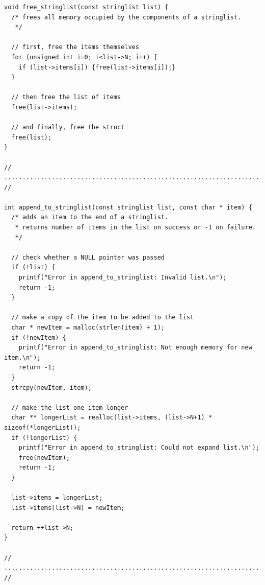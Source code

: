 \begin{codebox}[]
\begin{verbatim}
void free_stringlist(const stringlist list) {
  /* frees all memory occupied by the components of a stringlist.
   */
  
  // first, free the items themselves
  for (unsigned int i=0; i<list->N; i++) {
    if (list->items[i]) {free(list->items[i]);}
  }
  
  // then free the list of items
  free(list->items);
  
  // and finally, free the struct
  free(list);
}

// ......................................................................... //

int append_to_stringlist(const stringlist list, const char * item) {
  /* adds an item to the end of a stringlist.
   * returns number of items in the list on success or -1 on failure.
   */
  
  // check whether a NULL pointer was passed
  if (!list) {
    printf("Error in append_to_stringlist: Invalid list.\n");
    return -1;
  }
  
  // make a copy of the item to be added to the list
  char * newItem = malloc(strlen(item) + 1);
  if (!newItem) {
    printf("Error in append_to_stringlist: Not enough memory for new item.\n");
    return -1;
  }
  strcpy(newItem, item);
  
  // make the list one item longer
  char ** longerList = realloc(list->items, (list->N+1) * sizeof(*longerList));
  if (!longerList) {
    printf("Error in append_to_stringlist: Could not expand list.\n");
    free(newItem);
    return -1;
  }
  
  list->items = longerList;
  list->items[list->N] = newItem;
  
  return ++list->N;
}

// ......................................................................... //
\end{verbatim}
\end{codebox}

